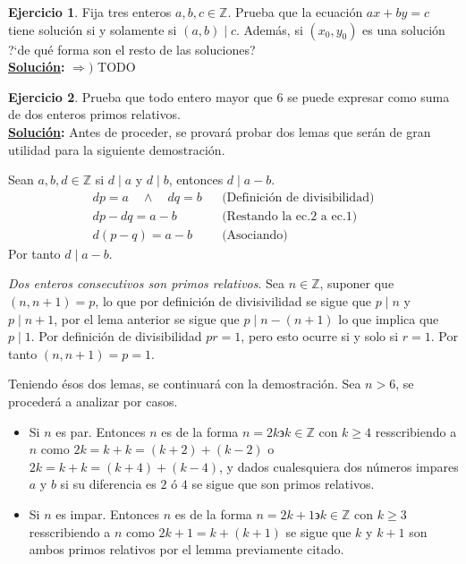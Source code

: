 \documentclass[11pt,letterpaper]{article}
\theoremstyle{definition}\newtheorem{p}{Ejercicio}
\theoremstyle{definition}\newtheorem{pp}[p]{$(*)$Ejercicio}
\numberwithin{p}{section}
\newcommand{\Z}{\mathbb{Z}}
\newcommand{\sol}{\textbf{\underline{Solución}: }} %
\begin{document}
\begin{p}
  Fija tres enteros $a,b,c\in\Z$. Prueba que la ecuaci\'on $ax+by=c$ tiene soluci\'on si y solamente si $(a,b)\mid c$.
  Adem\'as, si $(x_0,y_0)$ es una soluci\'on ?`de qu\'e forma son el resto de las soluciones?\\
  \sol $\Rightarrow )$ TODO
  
\end{p}
%
\begin{p}
  Prueba que todo entero mayor que 6 se puede expresar como suma de dos enteros primos relativos.\\
  \sol Antes de proceder, se provará probar dos lemas que serán de gran utilidad para la siguiente demostración.
  \begin{lemma}
  Sean $a, b, d \in \Z$ si $d \mid a$ y $d \mid b$, entonces $d \mid a-b$.
  \begin{align*}
  dp = a \quad \land \quad dq=b && \text{(Definición de divisibilidad)}\\ 
  dp - dq = a -b && \text{(Restando la ec.2 a ec.1)}\\
  d(p-q) = a-b && \text{(Asociando)}
  \end{align*}
  Por tanto $d \mid a-b$.
  \end{lemma}
  \begin{lemma}
  \emph{Dos enteros consecutivos son primos relativos}. Sea $n \in \Z$, suponer que $(n, n+1)=p$, lo que
  por definición de divisivilidad se sigue que $p \mid n$ y $p \mid n+1$, por el lema anterior se sigue que
  $p \mid n - (n+1)$ lo que implica que  $p \mid 1$. Por definición de divisibilidad $pr=1$, pero esto ocurre
  si y solo si $r=1$. Por tanto $(n, n+1)=p=1$.
  \end{lemma}
  
  Teniendo ésos dos lemas, se continuará con la demostración. Sea $n>6$, se procederá a analizar por casos.
  \begin{itemize}
    \item Si $n$ es par. Entonces $n$ es de la forma $n=2k \backepsilon k \in \Z$ con $k \geq 4$
    resscribiendo a $n$ como $2k=k+k=(k+2)+(k-2)$ o $2k=k+k=(k+4)+(k-4)$, y  dados cualesquiera
    dos números impares $a$ y $b$ si su diferencia es $2$ ó $4$ se sigue que son primos relativos.
    \item Si $n$ es impar. Entonces $n$ es de la forma $n=2k+1 \backepsilon k \in \Z$ con $k \geq 3$ 
    resscribiendo a $n$ como $2k+1= k + (k +1)$ se sigue que $k$ y $k+1$ son ambos primos relativos
    por el lemma previamente citado.
    
  \end{itemize}
\end{p}
\end{document}
